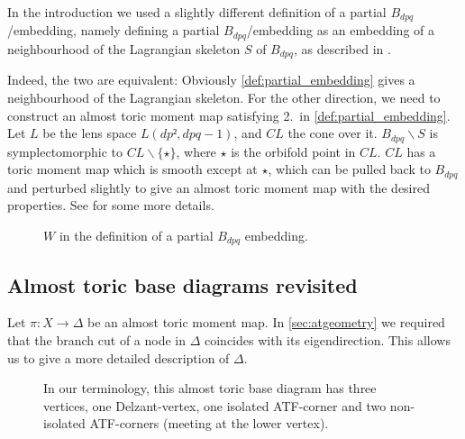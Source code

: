 \documentclass[12pt,a4paper,abstract=true,final]{scrartcl}
\begin{document}
\begin{remark}
  In the introduction we used a slightly different definition of a partial $B_{dpq}$\-/embedding, namely defining a partial $B_{dpq}$\-/embedding as an embedding of a neighbourhood of the Lagrangian skeleton $S$ of $B_{dpq}$, as described in \cite[Remark 7.10]{evans2021atfs}.

  Indeed, the two are equivalent:
  Obviously \cref{def:partial_embedding} gives a neighbourhood of the Lagrangian skeleton.
  For the other direction, we need to construct an almost toric moment map satisfying 2.\ in \cref{def:partial_embedding}.
  Let $L$ be the lens space $L(dp²,dpq-1)$, and $CL$ the cone over it.
  $B_{dpq} ∖ S$ is symplectomorphic to $C L ∖ \{ ⋆\}$, where $⋆$ is the orbifold point in $CL$.
  $CL$ has a toric moment map which is smooth except at $⋆$, which can be pulled back to $B_{dpq}$ and perturbed slightly to give an almost toric moment map with the desired properties.
  See \cite{Eva19} for some more details.
\end{remark}

\begin{figure}
    \centering
    \caption{$W$ in the definition of a partial $B_{dpq}$ embedding.}
    \label{fig:partial-Bdpq-embedding}
\end{figure}

\subsection{Almost toric base diagrams revisited}
\label{sec:atf_base_diagrams}

Let $π:X → Δ$ be an almost toric moment map.
In \cref{sec:atgeometry} we required that the branch cut of a node in $Δ$ coincides with its eigendirection.
This allows us to give a more detailed description of $Δ$.

\begin{figure}
  \centering
  \caption{In our terminology, this almost toric base diagram has three vertices, one Delzant-vertex, one isolated ATF-corner and two non-isolated ATF-corners (meeting at the lower vertex).}
  \label{fig:atf_example2}
\end{figure}
\end{document}
